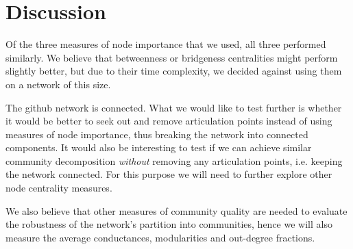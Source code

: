 \documentclass[9pt,twocolumn,twoside]{pnas-new}
\begin{document}
\pagebreak
\section*{Discussion}
Of the three measures of node importance that we used, all three performed similarly. 
We believe that betweenness or bridgeness centralities might perform slightly better, but due to their time complexity, we decided against using them on a network of this size.

The github network is connected. 
What we would like to test further is whether it would be better to seek out and remove articulation points instead of using measures of node importance, thus breaking the network into connected components.
It would also be interesting to test if we can achieve similar community decomposition \emph{without} removing any articulation points,
i.e. keeping the network connected. For this purpose we will need to further explore other node centrality measures.

We also believe that other measures of community quality are needed to evaluate the robustness of the network's partition into communities, hence we will also measure the average conductances, modularities and out-degree fractions.






\end{document}
